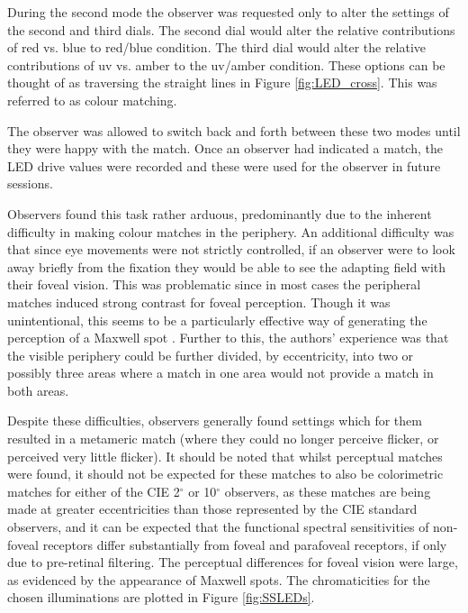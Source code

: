 During the second mode the observer was requested only to alter the settings of the second and third dials. The second dial would alter the relative contributions of red vs. blue to red/blue condition. The third dial would alter the relative contributions of uv vs. amber to the uv/amber condition. These options can be thought of as traversing the straight lines in Figure \ref{fig:LED_cross}. This was referred to as colour matching.


The observer was allowed to switch back and forth between these two modes until they were happy with the match. Once an observer had indicated a match, the LED drive values were recorded and these were used for the observer in future sessions.

Observers found this task rather arduous, predominantly due to the inherent difficulty in making colour matches in the periphery. An additional difficulty was that since eye movements were not strictly controlled, if an observer were to look away briefly from the fixation they would be able to see the adapting field with their foveal vision. This was problematic since in most cases the peripheral matches induced strong contrast for foveal perception. Though it was unintentional, this seems to be a particularly effective way of generating the perception of a Maxwell spot \citep{isobe_functional_1955}. Further to this, the authors' experience was that the visible periphery could be further divided, by eccentricity, into two or possibly three areas where a match in one area would not provide a match in both areas.

Despite these difficulties, observers generally found settings which for them resulted in a metameric match (where they could no longer perceive flicker, or perceived very little flicker). It should be noted that whilst perceptual matches were found, it should not be expected for these matches to also be colorimetric matches for either of the \gls{CIE} 2$^{\circ}$ or 10$^{\circ}$ observers, as these matches are being made at greater eccentricities than those represented by the \gls{CIE} standard observers, and it can be expected that the functional spectral sensitivities of non-foveal receptors differ substantially from foveal and parafoveal receptors, if only due to pre-retinal filtering. The perceptual differences for foveal vision were large, as evidenced by the appearance of Maxwell spots. The chromaticities for the chosen illuminations are plotted in Figure \ref{fig:SSLEDs}.

